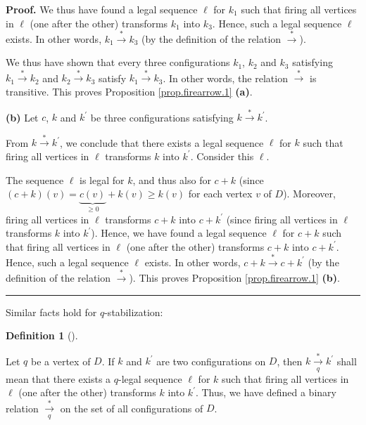 \documentclass[numbers=enddot,12pt,final,onecolumn,notitlepage]{scrartcl}%
\theoremstyle{definition}
\newtheorem{defi}[theo]{Definition}
\newenvironment{definition}[1][]
{\begin{defi}[#1]\begin{leftbar}}
{\end{leftbar}\end{defi}}
\newenvironment{proof}[1][Proof]{\noindent\textbf{#1.} }{\ \rule{0.5em}{0.5em}}
\begin{document}
\begin{proof}
We thus have found a legal sequence $\ell$ for $k_{1}$ such that firing all
vertices in $\ell$ (one after the other) transforms $k_{1}$ into $k_{3}$.
Hence, such a legal sequence $\ell$ exists. In other words, $k_{1}%
\overset{\ast}{\rightarrow}k_{3}$ (by the definition of the relation
$\overset{\ast}{\rightarrow}$).

We thus have shown that every three configurations $k_{1}$, $k_{2}$ and
$k_{3}$ satisfying $k_{1}\overset{\ast}{\rightarrow}k_{2}$ and $k_{2}%
\overset{\ast}{\rightarrow}k_{3}$ satisfy $k_{1}\overset{\ast}{\rightarrow
}k_{3}$. In other words, the relation $\overset{\ast}{\rightarrow}$ is
transitive. This proves Proposition \ref{prop.firearrow.1} \textbf{(a)}.

\textbf{(b)} Let $c$, $k$ and $k^{\prime}$ be three configurations satisfying
$k\overset{\ast}{\rightarrow}k^{\prime}$.

From $k\overset{\ast}{\rightarrow}k^{\prime}$, we conclude that there exists a
legal sequence $\ell$ for $k$ such that firing all vertices in $\ell$
transforms $k$ into $k^{\prime}$. Consider this $\ell$.

The sequence $\ell$ is legal for $k$, and thus also for $c+k$ (since $\left(
c+k\right)  \left(  v\right)  =\underbrace{c\left(  v\right)  }_{\geq
0}+k\left(  v\right)  \geq k\left(  v\right)  $ for each vertex $v$ of $D$).
Moreover, firing all vertices in $\ell$ transforms $c+k$ into $c+k^{\prime}$
(since firing all vertices in $\ell$ transforms $k$ into $k^{\prime}$). Hence,
we have found a legal sequence $\ell$ for $c+k$ such that firing all vertices
in $\ell$ (one after the other) transforms $c+k$ into $c+k^{\prime}$. Hence,
such a legal sequence $\ell$ exists. In other words, $c+k\overset{\ast
}{\rightarrow}c+k^{\prime}$ (by the definition of the relation $\overset{\ast
}{\rightarrow}$). This proves Proposition \ref{prop.firearrow.1} \textbf{(b)}.
\end{proof}

Similar facts hold for $q$-stabilization:

\begin{definition}
\label{def.firearrow-q}Let $q$ be a vertex of $D$. If $k$ and $k^{\prime}$ are
two configurations on $D$, then $k\underset{q}{\overset{\ast}{\rightarrow}%
}k^{\prime}$ shall mean that there exists a $q$-legal sequence $\ell$ for $k$
such that firing all vertices in $\ell$ (one after the other) transforms $k$
into $k^{\prime}$. Thus, we have defined a binary relation
$\underset{q}{\overset{\ast}{\rightarrow}}$ on the set of all configurations
of $D$.
\end{definition}
\end{document}
